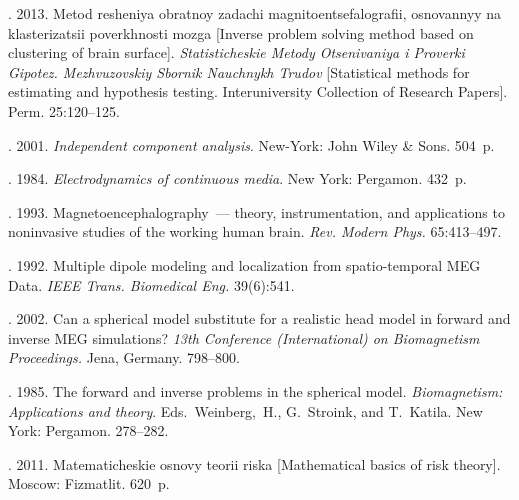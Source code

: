 \begin{multicols}{2}
{{\begin{thebibliography}{99}
.
2013. Metod resheniya obratnoy zadachi mag\-ni\-to\-en\-tse\-falografii, osnovannyy na
klasterizatsii poverkhnosti mozga [Inverse problem solving method based on
clustering of brain surface]. \textit{Statisticheskie Metody Otsenivaniya i
Proverki Gipotez. Mezhvuzovskiy Sbornik Nauchnykh Trudov}
[Statistical methods for estimating and hypothesis testing. Interuniversity
Collection of Research Papers]. Perm. 25:120--125.

.
2001. \textit{Independent component analysis}. New-York: John Wiley \& Sons.
504~p.

.
1984. \textit{Electrodynamics of continuous media}.  New York: Pergamon.
432~p.


.
1993. Magnetoencephalography~--- theory, instrumentation, and applications to
noninvasive studies of the working human brain.
\textit{Rev. Modern Phys.} 65:413--497.

. 1992.
Multiple dipole modeling and localization from spatio-temporal MEG Data.
\textit{IEEE Trans. Biomedical Eng.} 39(6):541.

.  2002.
Can a spherical model substitute for a realistic head model in forward
and inverse MEG simulations? \textit{13th  Conference (International)
on Biomagnetism Proceedings.} Jena, Germany. 798--800.

.
1985. The forward and inverse problems in the spherical model.
\textit{Biomagnetism: Applications and theory}.
Eds.~Weinberg,~H., G.~Stroink, and T.~Katila. New York: Pergamon. 278--282.

. 2011.
Matematicheskie osnovy teorii riska [Mathematical basics of risk theory].
Moscow: Fizmatlit. 620~p.

\end{thebibliography}
} }


\end{multicols}


